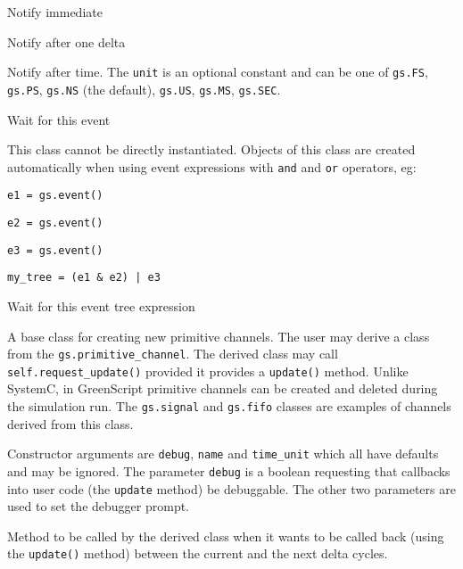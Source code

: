 \documentclass[12pt,oneside]{gsbook}
\begin{document}
\begin{methods}

 {Notify immediate}

 {Notify after one delta}

 {Notify after time. The \texttt{unit} is
an optional constant and can be one of \texttt{gs.FS},
\texttt{gs.PS}, \texttt{gs.NS} (the default),
\texttt{gs.US}, \texttt{gs.MS}, \texttt{gs.SEC}.}

 {Wait for this event}

\end{methods}



 {This class cannot be directly
instantiated. Objects of this class are created automatically when
using event expressions with \texttt{and} and \texttt{or} operators,
eg:

\texttt{e1 = gs.event()}

\texttt{e2 = gs.event()}

\texttt{e3 = gs.event()}

\texttt{my\_tree = (e1 \& e2) | e3}
}

\begin{methods}

 {Wait for this event tree expression}

\end{methods}



\newpage
{} {A base class for creating new
primitive channels.  The user may derive a class from the
\texttt{gs.primitive\_channel}.  The derived class may call
\texttt{self.request\_update()} provided it provides a \texttt{update()}
method.  Unlike SystemC, in GreenScript
primitive channels can be created and deleted during the simulation
run. The \texttt{gs.signal} and \texttt{gs.fifo} classes are examples
of channels derived from this class.}

Constructor arguments are \texttt{debug}, \texttt{name} and \texttt{time\_unit}
which all have defaults and may be ignored.  The parameter \texttt{debug} is a boolean
requesting that callbacks into user code (the \texttt{update} method) be
debuggable.  The other two parameters are used to set the debugger prompt.

\begin{methods}

 {Method to be called by the derived class when it
wants to be called back (using the \texttt{update()} method) between the
current and the next delta cycles.}

\end{methods}
\end{document}
